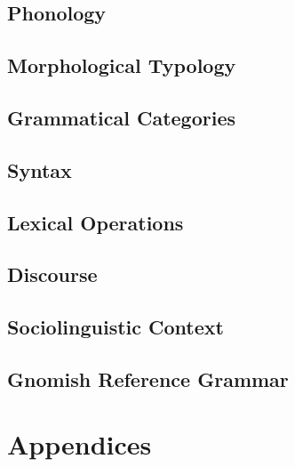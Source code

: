 \documentclass[12pt,letterpaper,openany,twoside]{memoir}
\let\originalpart=\part
\def\part{\cleardoublepage\originalpart}
\begin{document}
\chapter{Phonology}

\chapter{Morphological Typology}

\chapter{Grammatical Categories}

\chapter{Syntax}

\chapter{Lexical Operations}

\chapter{Discourse}

\chapter{Sociolinguistic Context}

\chapter{Gnomish Reference Grammar}


\appendix

\part{Appendices}




\backmatter


\printbibliography


\printindex
\end{document}
